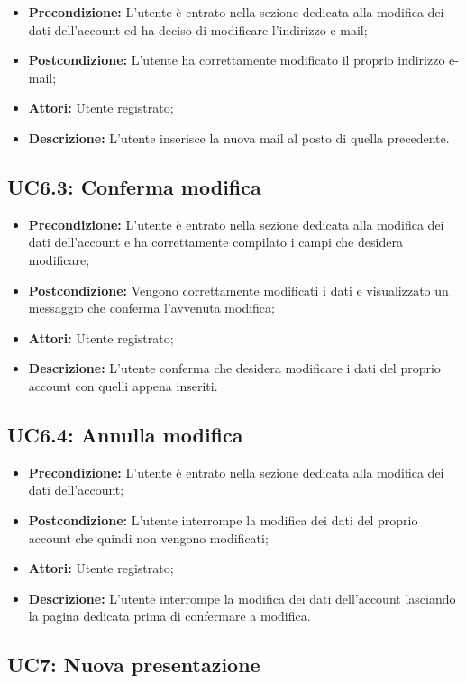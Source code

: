 \begin{itemize}
	\item \textbf{Precondizione:} L’utente è entrato nella sezione dedicata alla modifica dei dati dell’account ed ha deciso di modificare l’indirizzo e-mail;
	\item \textbf{Postcondizione:} L’utente ha correttamente modificato il proprio indirizzo e-mail;
	\item \textbf{Attori:} Utente registrato;
	\item \textbf{Descrizione:} L’utente inserisce la nuova mail al posto di quella precedente.
\end{itemize}
\subsection{ UC6.3: Conferma modifica}

\begin{itemize}
	\item \textbf{Precondizione:} L’utente è entrato nella sezione dedicata alla modifica dei dati dell’account e ha correttamente compilato i campi che desidera modificare;
	\item \textbf{Postcondizione:} Vengono correttamente modificati i dati e visualizzato un messaggio che conferma l’avvenuta modifica;
	\item \textbf{Attori:} Utente registrato;
	\item \textbf{Descrizione:} L’utente conferma che desidera modificare i dati del proprio account con quelli appena inseriti.
\end{itemize}
\subsection{ UC6.4: Annulla modifica}

\begin{itemize}
	\item \textbf{Precondizione:} L’utente è entrato nella sezione dedicata alla modifica dei dati dell’account;
	\item \textbf{Postcondizione:} L’utente interrompe la modifica dei dati del proprio account che quindi non vengono modificati;
	\item \textbf{Attori:} Utente registrato;
	\item \textbf{Descrizione:} L’utente interrompe la modifica dei dati dell’account lasciando la pagina dedicata prima di confermare a modifica.
\end{itemize}
\subsection{ UC7: Nuova presentazione}

